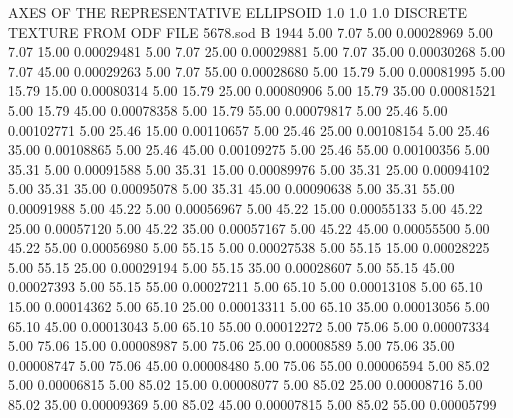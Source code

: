 AXES OF THE REPRESENTATIVE ELLIPSOID
   1.0   1.0   1.0
DISCRETE TEXTURE FROM ODF FILE  5678.sod                                
B    1944
      5.00      7.07      5.00     0.00028969
      5.00      7.07     15.00     0.00029481
      5.00      7.07     25.00     0.00029881
      5.00      7.07     35.00     0.00030268
      5.00      7.07     45.00     0.00029263
      5.00      7.07     55.00     0.00028680
      5.00     15.79      5.00     0.00081995
      5.00     15.79     15.00     0.00080314
      5.00     15.79     25.00     0.00080906
      5.00     15.79     35.00     0.00081521
      5.00     15.79     45.00     0.00078358
      5.00     15.79     55.00     0.00079817
      5.00     25.46      5.00     0.00102771
      5.00     25.46     15.00     0.00110657
      5.00     25.46     25.00     0.00108154
      5.00     25.46     35.00     0.00108865
      5.00     25.46     45.00     0.00109275
      5.00     25.46     55.00     0.00100356
      5.00     35.31      5.00     0.00091588
      5.00     35.31     15.00     0.00089976
      5.00     35.31     25.00     0.00094102
      5.00     35.31     35.00     0.00095078
      5.00     35.31     45.00     0.00090638
      5.00     35.31     55.00     0.00091988
      5.00     45.22      5.00     0.00056967
      5.00     45.22     15.00     0.00055133
      5.00     45.22     25.00     0.00057120
      5.00     45.22     35.00     0.00057167
      5.00     45.22     45.00     0.00055500
      5.00     45.22     55.00     0.00056980
      5.00     55.15      5.00     0.00027538
      5.00     55.15     15.00     0.00028225
      5.00     55.15     25.00     0.00029194
      5.00     55.15     35.00     0.00028607
      5.00     55.15     45.00     0.00027393
      5.00     55.15     55.00     0.00027211
      5.00     65.10      5.00     0.00013108
      5.00     65.10     15.00     0.00014362
      5.00     65.10     25.00     0.00013311
      5.00     65.10     35.00     0.00013056
      5.00     65.10     45.00     0.00013043
      5.00     65.10     55.00     0.00012272
      5.00     75.06      5.00     0.00007334
      5.00     75.06     15.00     0.00008987
      5.00     75.06     25.00     0.00008589
      5.00     75.06     35.00     0.00008747
      5.00     75.06     45.00     0.00008480
      5.00     75.06     55.00     0.00006594
      5.00     85.02      5.00     0.00006815
      5.00     85.02     15.00     0.00008077
      5.00     85.02     25.00     0.00008716
      5.00     85.02     35.00     0.00009369
      5.00     85.02     45.00     0.00007815
      5.00     85.02     55.00     0.00005799
